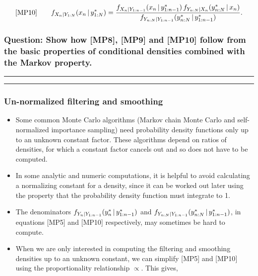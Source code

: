 \documentclass[]{article}
\begin{document}
$$\text{[MP10]}
\quad\quad \displaystyle  f_{X_{n}|Y_{1:N}}(x_n{\, | \,} y_{1:N}^*) = \frac{ f_{X_{n}|Y_{1:n-1}}(x_{n}{\, | \,} y_{1:n-1}^*) \, f_{Y_{n:N}|X_{n}}(y_{n:N}^*{\, | \,} x_n) }{ f_{Y_{n:N}|Y_{1:n-1}}(y_{n:N}^*{\, | \,} y_{1:n-1}^*) }.$$

\subsubsection{Question: Show how {[}MP8{]}, {[}MP9{]} and {[}MP10{]}
follow from the basic properties of conditional densities combined with
the Markov
property.}\label{question-show-how-mp8-mp9-and-mp10-follow-from-the-basic-properties-of-conditional-densities-combined-with-the-markov-property.}

\begin{center}\rule{0.5\linewidth}{\linethickness}\end{center}

\begin{center}\rule{0.5\linewidth}{\linethickness}\end{center}

\subsubsection{Un-normalized filtering and
smoothing}\label{un-normalized-filtering-and-smoothing}

\begin{itemize}
\item
  Some common Monte Carlo algorithms (Markov chain Monte Carlo and
  self-normalized importance sampling) need probability density
  functions only up to an unknown constant factor. These algorithms
  depend on ratios of densities, for which a constant factor cancels out
  and so does not have to be computed.
\item
  In some analytic and numeric computations, it is helpful to avoid
  calculating a normalizing constant for a density, since it can be
  worked out later using the property that the probability density
  function must integrate to 1.
\item
  The denominators
  \(f_{Y_{n}|Y_{1:n-1}}(y_n^*{\, | \,} y_{1:n-1}^*)\) and
  \(f_{Y_{n:N}|Y_{1:n-1}}(y_{n:N}^*{\, | \,} y_{1:n-1}^*)\), in
  equations {[}MP5{]} and {[}MP10{]} respectively, may sometimes be hard
  to compute.
\item
  When we are only interested in computing the filtering and smoothing
  densities up to an unknown constant, we can simplify {[}MP5{]} and
  {[}MP10{]} using the proportionality relationship \(\propto\). This
  gives,
\end{itemize}
\end{document}
